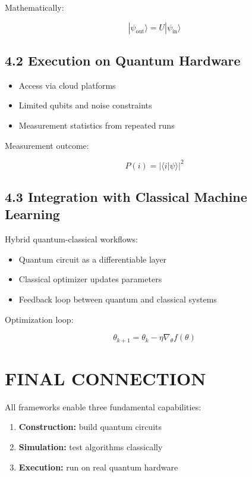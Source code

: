 Mathematically:

\[
|\psi_{\text{out}}\rangle = U |\psi_{\text{in}}\rangle
\]

\vspace{0.3cm}

\subsection*{4.2 Execution on Quantum Hardware}

\begin{itemize}
\item Access via cloud platforms
\item Limited qubits and noise constraints
\item Measurement statistics from repeated runs
\end{itemize}

Measurement outcome:

\[
P(i) = |\langle i | \psi \rangle|^2
\]

\vspace{0.3cm}

\subsection*{4.3 Integration with Classical Machine Learning}

Hybrid quantum-classical workflows:

\begin{itemize}
\item Quantum circuit as a differentiable layer
\item Classical optimizer updates parameters
\item Feedback loop between quantum and classical systems
\end{itemize}

Optimization loop:

\[
\theta_{k+1} = \theta_k - \eta \nabla_\theta f(\theta)
\]

\vspace{0.5cm}

\section*{FINAL CONNECTION}

All frameworks enable three fundamental capabilities:

\begin{enumerate}
\item \textbf{Construction:} build quantum circuits
\item \textbf{Simulation:} test algorithms classically
\item \textbf{Execution:} run on real quantum hardware
\end{enumerate}

